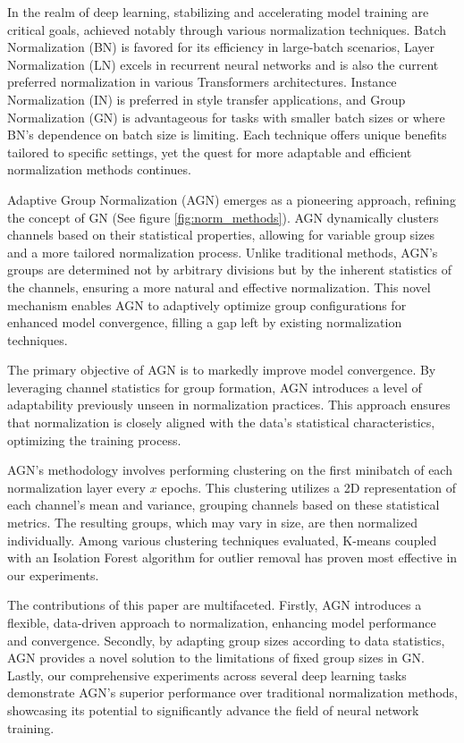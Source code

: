 In the realm of deep learning, stabilizing and accelerating model training are critical goals, achieved notably through various normalization techniques. Batch Normalization (BN) is favored for its efficiency in large-batch scenarios, Layer Normalization (LN) excels in recurrent neural networks and is also the current preferred normalization in various Transformers architectures. Instance Normalization (IN) is preferred in style transfer applications, and Group Normalization (GN) is advantageous for tasks with smaller batch sizes or where BN's dependence on batch size is limiting. Each technique offers unique benefits tailored to specific settings, yet the quest for more adaptable and efficient normalization methods continues.

Adaptive Group Normalization (AGN) emerges as a pioneering approach, refining the concept of GN (See figure \ref{fig:norm_methods}). AGN dynamically clusters channels based on their statistical properties, allowing for variable group sizes and a more tailored normalization process. Unlike traditional methods, AGN's groups are determined not by arbitrary divisions but by the inherent statistics of the channels, ensuring a more natural and effective normalization. This novel mechanism enables AGN to adaptively optimize group configurations for enhanced model convergence, filling a gap left by existing normalization techniques.

The primary objective of AGN is to markedly improve model convergence. By leveraging channel statistics for group formation, AGN introduces a level of adaptability previously unseen in normalization practices. This approach ensures that normalization is closely aligned with the data's statistical characteristics, optimizing the training process.

AGN's methodology involves performing clustering on the first minibatch of each normalization layer every \(x\) epochs. This clustering utilizes a 2D representation of each channel's mean and variance, grouping channels based on these statistical metrics. The resulting groups, which may vary in size, are then normalized individually. Among various clustering techniques evaluated, K-means coupled with an Isolation Forest algorithm for outlier removal has proven most effective in our experiments.

The contributions of this paper are multifaceted. Firstly, AGN introduces a flexible, data-driven approach to normalization, enhancing model performance and convergence. Secondly, by adapting group sizes according to data statistics, AGN provides a novel solution to the limitations of fixed group sizes in GN. Lastly, our comprehensive experiments across several deep learning tasks demonstrate AGN's superior performance over traditional normalization methods, showcasing its potential to significantly advance the field of neural network training.